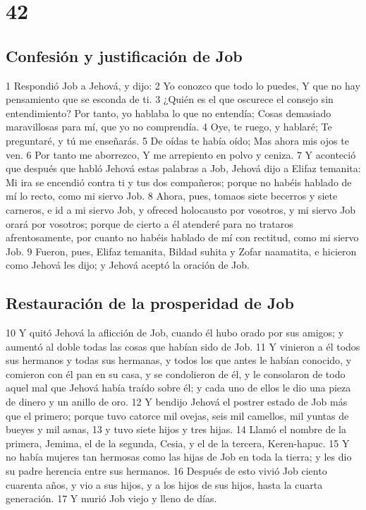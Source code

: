 \chapter{42}

\section*{Confesión y justificación de Job}

1 Respondió Job a Jehová, y dijo:
2 Yo conozco que todo lo puedes,
Y que no hay pensamiento que se esconda de ti.
3 ¿Quién es el que oscurece el consejo sin entendimiento?
Por tanto, yo hablaba lo que no entendía;
Cosas demasiado maravillosas para mí, que yo no comprendía.
4 Oye, te ruego, y hablaré;
Te preguntaré, y tú me enseñarás. 
5 De oídas te había oído;
Mas ahora mis ojos te ven.
6 Por tanto me aborrezco,
Y me arrepiento en polvo y ceniza.
7 Y aconteció que después que habló Jehová estas palabras a Job, Jehová dijo a Elifaz temanita: Mi ira se encendió contra ti y tus dos compañeros; porque no habéis hablado de mí lo recto, como mi siervo Job.
8 Ahora, pues, tomaos siete becerros y siete carneros, e id a mi siervo Job, y ofreced holocausto por vosotros, y mi siervo Job orará por vosotros; porque de cierto a él atenderé para no trataros afrentosamente, por cuanto no habéis hablado de mí con rectitud, como mi siervo Job.
9 Fueron, pues, Elifaz temanita, Bildad suhita y Zofar naamatita, e hicieron como Jehová les dijo; y Jehová aceptó la oración de Job.

\section*{Restauración de la prosperidad de Job}

10 Y quitó Jehová la aflicción de Job, cuando él hubo orado por sus amigos; y aumentó al doble todas las cosas que habían sido de Job. 
11 Y vinieron a él todos sus hermanos y todas sus hermanas, y todos los que antes le habían conocido, y comieron con él pan en su casa, y se condolieron de él, y le consolaron de todo aquel mal que Jehová había traído sobre él; y cada uno de ellos le dio una pieza de dinero y un anillo de oro.
12 Y bendijo Jehová el postrer estado de Job más que el primero; porque tuvo catorce mil ovejas, seis mil camellos, mil yuntas de bueyes y mil asnas,
13 y tuvo siete hijos y tres hijas.
14 Llamó el nombre de la primera, Jemima, el de la segunda, Cesia, y el de la tercera, Keren-hapuc.
15 Y no había mujeres tan hermosas como las hijas de Job en toda la tierra; y les dio su padre herencia entre sus hermanos.
16 Después de esto vivió Job ciento cuarenta años, y vio a sus hijos, y a los hijos de sus hijos, hasta la cuarta generación.
17 Y murió Job viejo y lleno de días.

